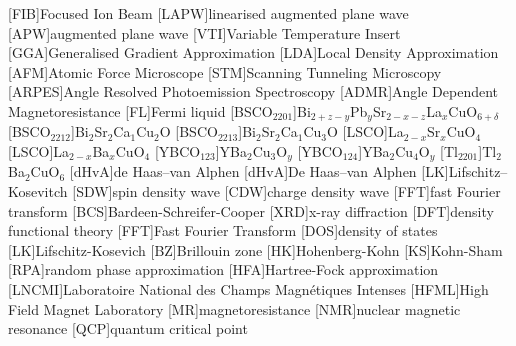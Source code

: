 
\cleardoublepage



[FIB]{Focused Ion Beam}
[LAPW]{linearised augmented plane wave}
[APW]{augmented plane wave}
[VTI]{Variable Temperature Insert}
[GGA]{Generalised Gradient Approximation}
[LDA]{Local Density Approximation}
[AFM]{Atomic Force Microscope}
[STM]{Scanning Tunneling Microscopy}
[ARPES]{Angle Resolved Photoemission Spectroscopy}
[ADMR]{Angle Dependent Magnetoresistance}
[FL]{Fermi liquid}
[BSCO$_{2201}$]{Bi$_{2+z-y}$Pb$_{y}$Sr$_{2-x-z}$La$_{x}$CuO$_{6+\delta}$}
[BSCO$_{2212}$]{Bi$_2$Sr$_2$Ca$_1$Cu$_2$O}
[BSCO$_{2213}$]{Bi$_2$Sr$_2$Ca$_1$Cu$_3$O}
[LSCO]{La$_{2-x}$Sr$_x$CuO$_4$}
[LSCO]{La$_{2-x}$Ba$_x$CuO$_4$}
[YBCO$_{123}$]{YBa$_2$Cu$_3$O$_y$}
[YBCO$_{124}$]{YBa$_2$Cu$_4$O$_y$}
[Tl$_{2201}$]{Tl$_2$Ba$_2$CuO$_6$}
[dHvA]{de Haas--van Alphen}
[dHvA]{De Haas--van Alphen}
[LK]{Lifschitz--Kosevitch}
[SDW]{spin density wave}
[CDW]{charge density wave}
[FFT]{fast Fourier transform}
[BCS]{Bardeen-Schreifer-Cooper}
[XRD]{x-ray diffraction}
[DFT]{density functional theory}
[FFT]{Fast Fourier Transform}
[DOS]{density of states}
[LK]{Lifschitz-Kosevich}
[BZ]{Brillouin zone}
[HK]{Hohenberg-Kohn}
[KS]{Kohn-Sham}
[RPA]{random phase approximation}
[HFA]{Hartree-Fock approximation}
[LNCMI]{Laboratoire National des Champs Magn\'{e}tiques Intenses} 
[HFML]{High Field Magnet Laboratory}
[MR]{magnetoresistance}
[NMR]{nuclear magnetic resonance}
[QCP]{quantum critical point}

